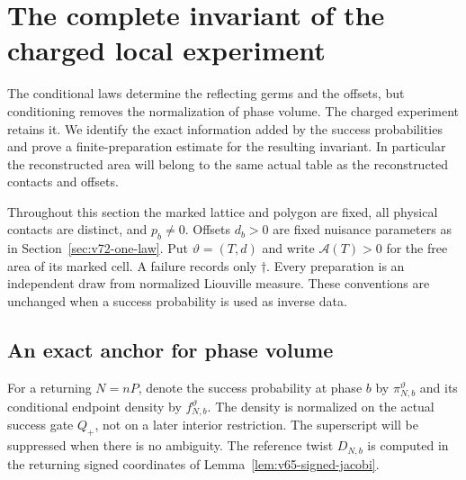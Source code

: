 \section{The complete invariant of the charged local experiment}
\label{sec:v73-complete-record}

The conditional laws determine the reflecting germs and the offsets, but
conditioning removes the normalization of phase volume.  The charged
experiment retains it.  We identify the exact information added by the
success probabilities and prove a finite-preparation estimate for the
resulting invariant.  In particular the reconstructed area will belong
to the same actual table as the reconstructed contacts and offsets.

Throughout this section the marked lattice and polygon are fixed, all
physical contacts are distinct, and $p_b\ne0$.  Offsets $d_b>0$ are
fixed nuisance parameters as in Section~\ref{sec:v72-one-law}.  Put
$\vartheta=(T,d)$ and write $\mathcal A(T)>0$ for the free area of its
marked cell.  A failure records only $\dagger$.  Every preparation is an
independent draw from normalized Liouville measure.  These conventions
are unchanged when a success probability is used as inverse data.

\subsection{An exact anchor for phase volume}

For a returning $N=nP$, denote the success probability at phase $b$ by
$\pi^\vartheta_{N,b}$ and its conditional endpoint density by
$f^\vartheta_{N,b}$.  The density is normalized on the actual success
gate $Q_+$, not on a later interior restriction.  The superscript will
be suppressed when there is no ambiguity.  The reference twist $D_{N,b}$
is computed in the returning signed coordinates of
Lemma~\ref{lem:v65-signed-jacobi}.

